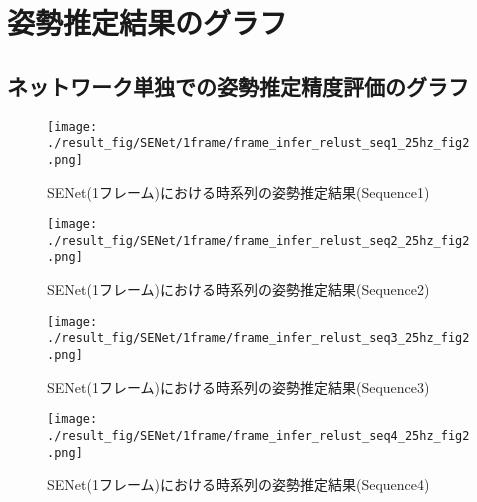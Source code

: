 \appendix

\chapter{姿勢推定結果のグラフ}
\section{ネットワーク単独での姿勢推定精度評価のグラフ}\label{sec:Verify_MAE_Network_Append}



\begin{figure}[thpb]
  \begin{minipage}[htpb]{1.0\hsize}
  \begin{center}
  \texttt{[image: ./result\_fig/SENet/1frame/frame\_infer\_relust\_seq1\_25hz\_fig2.png]}
  \caption{SENet(1フレーム)における時系列の姿勢推定結果(Sequence1)}
  \end{center}
  \end{minipage}
\end{figure}

\begin{figure}[thpb]
  \begin{minipage}[htpb]{1.0\hsize}
  \begin{center}
  \texttt{[image: ./result\_fig/SENet/1frame/frame\_infer\_relust\_seq2\_25hz\_fig2.png]}
  \caption{SENet(1フレーム)における時系列の姿勢推定結果(Sequence2)}
  \end{center}
  \end{minipage}
\end{figure}

\begin{figure}[thpb]
  \begin{minipage}[htpb]{1.0\hsize}
  \begin{center}
  \texttt{[image: ./result\_fig/SENet/1frame/frame\_infer\_relust\_seq3\_25hz\_fig2.png]}
  \caption{SENet(1フレーム)における時系列の姿勢推定結果(Sequence3)}
  \end{center}
  \end{minipage}
\end{figure}

\begin{figure}[thpb]
  \begin{minipage}[htpb]{1.0\hsize}
  \begin{center}
  \texttt{[image: ./result\_fig/SENet/1frame/frame\_infer\_relust\_seq4\_25hz\_fig2.png]}
  \caption{SENet(1フレーム)における時系列の姿勢推定結果(Sequence4)}
  \end{center}
  \end{minipage}
\end{figure}



